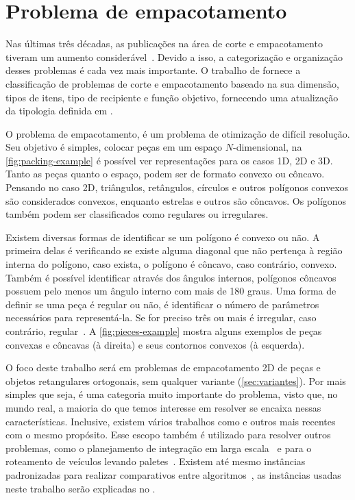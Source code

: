 \chapter{Problema de empacotamento}\label{ch:problema-de-empacotamento}

Nas últimas três décadas, as publicações na área de corte e empacotamento tiveram um aumento
considerável~\cite{exact-solution-techniques,wascher2007improved}.
Devido a isso, a categorização e organização desses problemas é cada vez mais importante.
O trabalho de  fornece a classificação de problemas de corte e
empacotamento baseado na sua dimensão, tipos de itens, tipo de recipiente e função objetivo,
fornecendo uma atualização da tipologia definida em .

O problema de empacotamento, é um problema de otimização de difícil resolução.
Seu objetivo é simples, colocar peças em um espaço $N$-dimensional, na \autoref{fig:packing-example}
é possível ver representações para os casos 1D, 2D e 3D\@.
Tanto as peças quanto o espaço, podem ser de formato convexo ou côncavo.
Pensando no caso 2D, triângulos, retângulos, círculos e outros polígonos convexos são
considerados convexos, enquanto estrelas e outros são côncavos.
Os polígonos também podem ser classificados como regulares ou irregulares.



Existem diversas formas de identificar se um polígono é convexo ou não.
A primeira delas é verificando se existe alguma diagonal que não pertença à região interna do
polígono, caso exista, o polígono é côncavo, caso contrário, convexo.
Também é possível identificar através dos ângulos internos, polígonos côncavos possuem pelo menos
um ângulo interno com mais de 180 graus.
Uma forma de definir se uma peça é regular ou não, é identificar o número de parâmetros
necessários para representá-la.
Se for preciso três ou mais é irregular, caso contrário, regular~\cite{aprendizado-reforco}.
A \autoref{fig:pieces-example} mostra alguns exemplos de peças convexas e côncavas (à direita)
e seus contornos convexos (à esquerda).



O foco deste trabalho será em problemas de empacotamento 2D de peças e objetos retangulares
ortogonais, sem qualquer variante (\autoref{sec:variantes}).
Por mais simples que seja, é uma categoria muito importante do problema, visto que, no mundo real,
a maioria do que temos interesse em resolver se encaixa nessas características.
Inclusive, existem vários trabalhos como  e outros mais recentes~\cite{
    martin2020models,firat2020effective,chen2019efficient} com o mesmo propósito.
Esse escopo também é utilizado para resolver outros problemas, como o planejamento de integração em
larga escala~\cite{huang2007efficient} e para o roteamento de veículos levando paletes~\cite{
    silva2022integer}.
Existem até mesmo instâncias padronizadas para realizar comparativos entre algoritmos~\cite{
    2DPackLib}, as instâncias usadas neste trabalho serão explicadas no .

